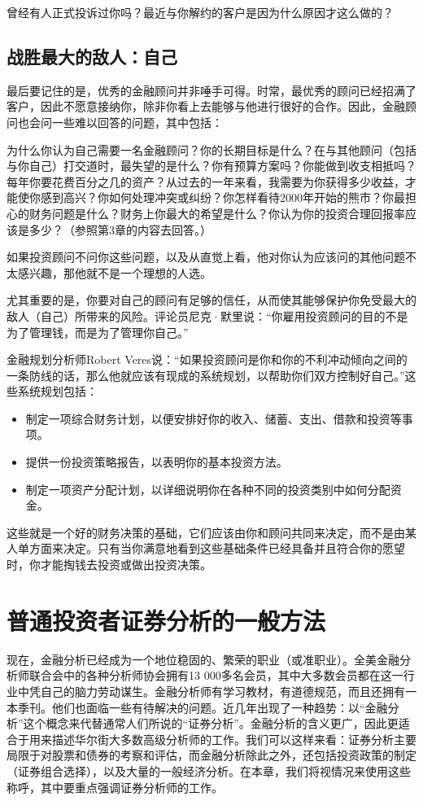 \documentclass[12pt,oneside]{book}
\begin{document}
曾经有人正式投诉过你吗？最近与你解约的客户是因为什么原因才这么做的？

\subsection{战胜最大的敌人：自己}
最后要记住的是，优秀的金融顾问并非唾手可得。时常，最优秀的顾问已经招满了客户，因此不愿意接纳你，除非你看上去能够与他进行很好的合作。因此，金融顾问也会问一些难以回答的问题，其中包括：

为什么你认为自己需要一名金融顾问？你的长期目标是什么？在与其他顾问（包括与你自己）打交道时，最失望的是什么？你有预算方案吗？你能做到收支相抵吗？每年你要花费百分之几的资产？从过去的一年来看，我需要为你获得多少收益，才能使你感到高兴？你如何处理冲突或纠纷？你怎样看待2000年开始的熊市？你最担心的财务问题是什么？财务上你最大的希望是什么？你认为你的投资合理回报率应该是多少？（参照第3章的内容去回答。）

如果投资顾问不问你这些问题，以及从直觉上看，他对你认为应该问的其他问题不太感兴趣，那他就不是一个理想的人选。

尤其重要的是，你要对自己的顾问有足够的信任，从而使其能够保护你免受最大的敌人（自己）所带来的风险。评论员尼克·默里说：“你雇用投资顾问的目的不是为了管理钱，而是为了管理你自己。”

金融规划分析师Robert Veres说：“如果投资顾问是你和你的不利冲动倾向之间的一条防线的话，那么他就应该有现成的系统规划，以帮助你们双方控制好自己。”这些系统规划包括：

\begin{itemize}
\item 制定一项综合财务计划，以便安排好你的收入、储蓄、支出、借款和投资等事项。
\item 提供一份投资策略报告，以表明你的基本投资方法。
\item 制定一项资产分配计划，以详细说明你在各种不同的投资类别中如何分配资金。
\end{itemize}


这些就是一个好的财务决策的基础，它们应该由你和顾问共同来决定，而不是由某人单方面来决定。只有当你满意地看到这些基础条件已经具备并且符合你的愿望时，你才能掏钱去投资或做出投资决策。

\section{普通投资者证券分析的一般方法}
现在，金融分析已经成为一个地位稳固的、繁荣的职业（或准职业）。全美金融分析师联合会中的各种分析师协会拥有13 000多名会员，其中大多数会员都在这一行业中凭自己的脑力劳动谋生。金融分析师有学习教材，有道德规范，而且还拥有一本季刊。他们也面临一些有待解决的问题。近几年出现了一种趋势：以“金融分析”这个概念来代替通常人们所说的“证券分析”。金融分析的含义更广，因此更适合于用来描述华尔街大多数高级分析师的工作。我们可以这样来看：证券分析主要局限于对股票和债券的考察和评估，而金融分析除此之外，还包括投资政策的制定（证券组合选择），以及大量的一般经济分析。在本章，我们将视情况来使用这些称呼，其中要重点强调证券分析师的工作。
\end{document}

